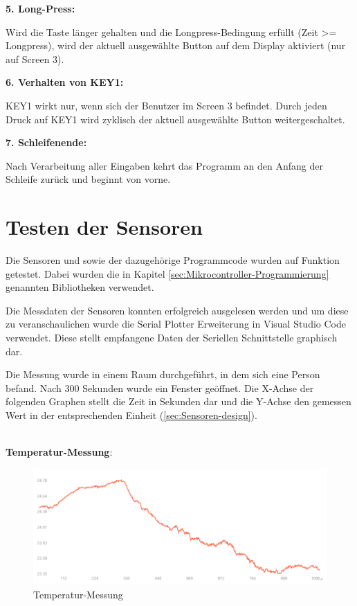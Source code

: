 \begin{inhalt}
\textbf{5. Long-Press:}

Wird die Taste länger gehalten und die Longpress-Bedingung erfüllt (Zeit >= Longpress), wird der aktuell ausgewählte Button auf dem Display aktiviert (nur auf Screen 3).

\textbf{6. Verhalten von KEY1:}

KEY1 wirkt nur, wenn sich der Benutzer im Screen 3 befindet. Durch jeden Druck auf KEY1 wird zyklisch der aktuell ausgewählte Button weitergeschaltet.

\textbf{7. Schleifenende:}

Nach Verarbeitung aller Eingaben kehrt das Programm an den Anfang der Schleife zurück und beginnt von vorne.



\section{Testen der Sensoren}

Die Sensoren und sowie der dazugehörige Programmcode wurden auf Funktion getestet. Dabei wurden die in Kapitel \ref{sec:Mikrocontroller-Programmierung} genannten Bibliotheken verwendet. 


Die Messdaten der Sensoren konnten erfolgreich ausgelesen werden und um diese zu veranschaulichen wurde die Serial Plotter Erweiterung in Visual Studio Code verwendet. Diese stellt empfangene Daten der Seriellen Schnittstelle graphisch dar. 

Die Messung wurde in einem Raum durchgeführt, in dem sich eine Person befand. Nach 300 Sekunden wurde ein Fenster geöffnet. Die X-Achse der folgenden Graphen stellt die Zeit in Sekunden dar und die Y-Achse den gemessen Wert in der entsprechenden Einheit (\ref{sec:Sensoren-design}). 

\bigskip \\

\textbf{Temperatur-Messung}:


\begin{figure}[!htb]
\centering
\includegraphics[width=1\textwidth]{files/Tobias/pics/Messungen/temperatur.PNG}
\caption[Temperatur-Messung]{Temperatur-Messung}
\label{fig:Temperatur-Messung}
\end{figure}


\end{inhalt}
